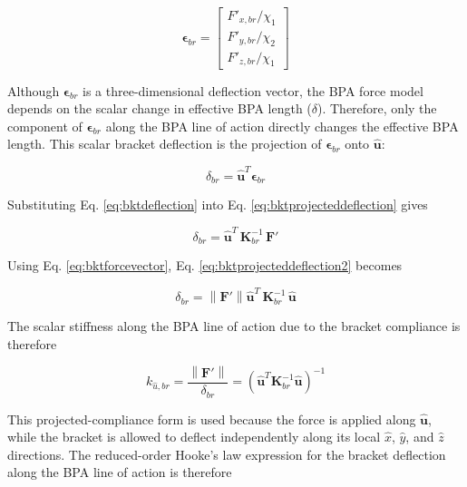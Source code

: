 \begin{equation}
\boldsymbol{\epsilon}_{br} = \begin{bmatrix} F'_{x,br}/\chi_{1} \\ F'_{y,br}/\chi_{2} \\ F'_{z,br}/\chi_{1} \end{bmatrix}
\label{eq:bktcomponentdeflection}
\end{equation}

Although $\boldsymbol{\epsilon}_{br}$ is a three-dimensional deflection vector, the BPA force model depends on the scalar change in effective BPA length ($\delta$). Therefore, only the component of $\boldsymbol{\epsilon}_{br}$ along the BPA line of action directly changes the effective BPA length. This scalar bracket deflection is the projection of $\boldsymbol{\epsilon}_{br}$ onto $\hat{\mathbf{u}}$:

\begin{equation}
{\delta}_{br} = \hat{\mathbf{u}}^{T} \boldsymbol{\epsilon}_{br}
\label{eq:bktprojecteddeflection}
\end{equation}

Substituting Eq. \ref{eq:bktdeflection} into Eq. \ref{eq:bktprojecteddeflection} gives

\begin{equation}
{\delta}_{br} = \hat{\mathbf{u}}^{T} \, \mathbf{K}_{br}^{-1} \, \mathbf{F}'
\label{eq:bktprojecteddeflection2}
\end{equation}

Using Eq. \ref{eq:bktforcevector}, Eq. \ref{eq:bktprojecteddeflection2} becomes

\begin{equation}
\delta_{br} = \left\| \mathbf{F}' \right\| \hat{\mathbf{u}}^{T} \, \mathbf{K}_{br}^{-1} \, \hat{\mathbf{u}}
\label{eq:bktprojectedcompliance}
\end{equation}

The scalar stiffness along the BPA line of action due to the bracket compliance is therefore

\begin{equation}
k_{\hat{u},br} = \frac{\left\| \mathbf{F}' \right\|}{\delta_{br}} = \left( \hat{\mathbf{u}}^{T} \mathbf{K}_{br}^{-1} \hat{\mathbf{u}} \right)^{-1}
\label{eq:keff}
\end{equation}

This projected-compliance form is used because the force is applied along $\hat{\mathbf{u}}$, while the bracket is allowed to deflect independently along its local $\hat{x}$, $\hat{y}$, and $\hat{z}$ directions. The reduced-order Hooke's law expression for the bracket deflection along the BPA line of action is therefore

